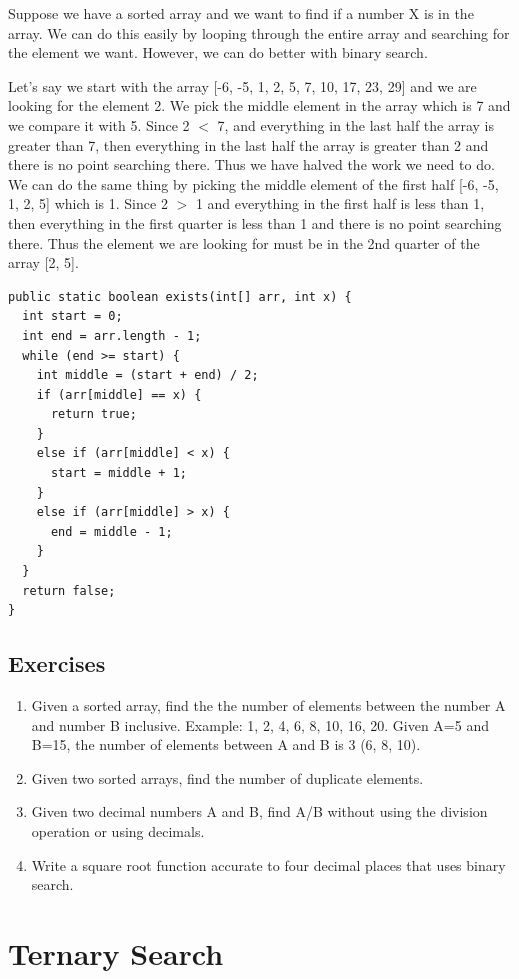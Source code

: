 \documentclass[11pt,oneside]{book}
\begin{document}
Suppose we have a sorted array and we want to find if a number X is in the array. We can do this easily by looping through the entire array and searching for the element we want. However, we can do better with binary search.

Let's say we start with the array [-6, -5, 1, 2, 5, 7, 10, 17, 23, 29] and we are looking for the element 2. We pick the middle element in the array which is 7 and we compare it with 5. Since 2 $<$ 7, and everything in the last half the array is greater than 7, then everything in the last half the array is greater than 2 and there is no point searching there. Thus we have halved the work we need to do. We can do the same thing by picking the middle element of the first half [-6, -5, 1, 2, 5] which is 1. Since 2 $>$ 1 and everything in the first half is less than 1, then everything in the first quarter is less than 1 and there is no point searching there. Thus the element we are looking for must be in the 2nd quarter of the array [2, 5].

\begin{lstlisting}
public static boolean exists(int[] arr, int x) {
  int start = 0;
  int end = arr.length - 1;
  while (end >= start) {
    int middle = (start + end) / 2;
    if (arr[middle] == x) {
      return true;
    }
    else if (arr[middle] < x) {
      start = middle + 1;
    }
    else if (arr[middle] > x) {
      end = middle - 1;
    }
  }
  return false;
}
\end{lstlisting}

\subsection{Exercises}

\begin{enumerate}
\item Given a sorted array, find the the number of elements between the number A and number B inclusive.
Example: 1, 2, 4, 6, 8, 10, 16, 20. Given A=5 and B=15, the number of elements between A and B is 3 (6, 8, 10).
\item Given two sorted arrays, find the number of duplicate elements.
\item Given two decimal numbers A and B, find A/B without using the division operation or using decimals.
\item Write a square root function accurate to four decimal places that uses binary search.
\end{enumerate}

        \section{ Ternary Search }
        
\end{document}
